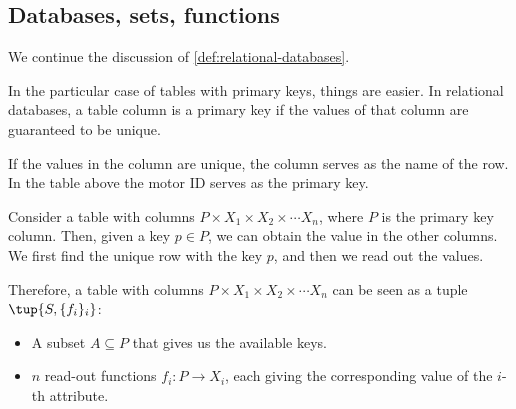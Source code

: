 \label{sec:specialization}

\subsection{Databases, sets, functions}

We continue the discussion of \cref{def:relational-databases}.

In the particular case of tables with primary keys,
things are easier. In relational databases, 
a table column is a primary key if the values of that column are guaranteed to be unique.

If the values in the column are unique, the column serves as the name of the row. In the table 
above the motor ID serves as the primary key.

Consider a table with columns $P \times X_1 \times X_2 \times \cdots X_n$,
where $P$ is the primary key column. Then, given a key $p \in P$,
we can obtain the value in the other columns. We first find the unique
row with the key $p$, and then we read out the values. 

Therefore, a table with columns $P \times X_1 \times X_2 \times \cdots X_n$
can be seen as a tuple $\tup{S, \{f_i\}_i}$:
\begin{itemize}
    \item A subset $A \subseteq P$ that gives us the available keys.
    \item $n$ read-out functions $f_i: P \to X_i$, each giving the 
    corresponding value of the $i$-th attribute.
\end{itemize}


\begin{comment}
\begin{table}[h]
    \centering
    \begin{tabular}{c|c|c|c|c|c}
         Motor ID & Company& Size & \unit[Weight]{[g]} & \unit[Max Power]{[W]} & \unit[price]{[USD]} \\
         \hline
         $\textsf{Model1}$&Company $\textsf{B}$ & 2 x 3 x 4& 10 & &259\\
         $\textsf{Model2}$&Company $\textsf{A}$ &2 x 3 x 4& 20 & &109\\
         $\textsf{Model3}$&Company $\textsf{B}$ &2 x 3 x 4& 5 & &124\\
         $\textsf{Model4}$&Company $\textsf{C}$ &2 x 3 x 4& 30 & &399\\
         $\textsf{Model5}$&Company $\textsf{A}$ &2 x 3 x 4& 45 & &245  \\
        $\textsf{Model6}$&Company $\textsf{D}$ & 2 x 3 x 4& 20 & &89\\
        $\textsf{Model7}$&Company $\textsf{B}$ & 2 x 3 x 4& 15 &&130
    \end{tabular}
    \caption{A simplified catalogue of motors.}
    \label{tab:electric_motors}
\end{table}
\end{comment}


